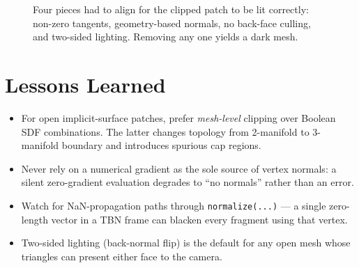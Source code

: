 \documentclass[11pt]{article}
\begin{document}
\begin{figure}[h]
  \centering
  \caption{\label{fig:fix} Four pieces had to align for the clipped
    patch to be lit correctly: non-zero tangents, geometry-based
    normals, no back-face culling, and two-sided lighting.  Removing
    any one yields a dark mesh.}
\end{figure}

\section{Lessons Learned}

\begin{itemize}
  \item For open implicit-surface patches, prefer \emph{mesh-level}
        clipping over Boolean SDF combinations.  The latter changes
        topology from 2-manifold to 3-manifold boundary and introduces
        spurious cap regions.
  \item Never rely on a numerical gradient as the sole source of
        vertex normals: a silent zero-gradient evaluation degrades to
        ``no normals'' rather than an error.
  \item Watch for NaN-propagation paths through \texttt{normalize(...)}
        --- a single zero-length vector
        in a TBN frame can blacken every fragment using that vertex.
  \item Two-sided lighting (back-normal flip) is the default for any
        open mesh whose triangles can present either face to the
        camera.
\end{itemize}
\end{document}
